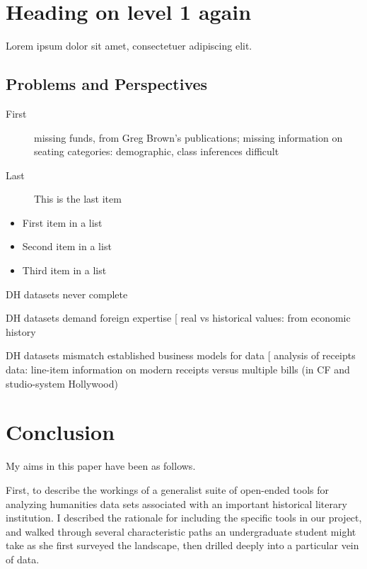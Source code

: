 \documentclass[	DIV=calc,%
							paper=a4,%
							fontsize=11pt,%
							twocolumn]{scrartcl}	 					%
\begin{document}
\section*{Heading on level 1 again}
Lorem ipsum dolor sit amet, consectetuer adipiscing elit.

\subsection*{Problems and Perspectives}

\begin{description}
	\item[First] missing funds, from Greg Brown’s publications; missing information on seating categories: demographic, class inferences difficult
	\item[Last] This is the last item
\end{description}

\begin{itemize}
	\item First item in a list
	\item Second item in a list
	\item Third item in a list
\end{itemize}

DH datasets never complete

DH datasets demand foreign expertise
  [ real vs historical values: from economic history

DH datasets mismatch established business models for data
  [ analysis of receipts data: line-item information on modern receipts versus multiple bills (in CF and studio-system Hollywood)

\section*{Conclusion}

My aims in this paper have been as follows.

First, to describe the workings of a generalist suite of open-ended tools for analyzing humanities data sets associated with an important historical literary institution.  I described the rationale for including the specific tools in our project, and walked through several characteristic paths an undergraduate student might take as she first surveyed the landscape, then drilled deeply into a particular vein of data.
\end{document}
